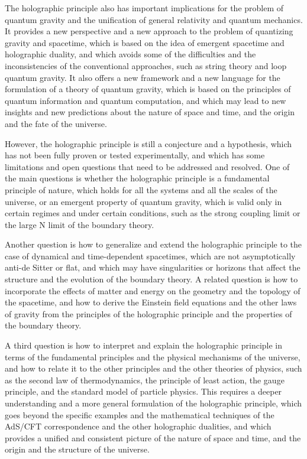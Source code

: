 \begin{tcolorbox}[colback=green!5!white,colframe=green!75!black,title=Question]
The holographic principle also has important implications for the problem of quantum gravity and the unification of general relativity and quantum mechanics. It provides a new perspective and a new approach to the problem of quantizing gravity and spacetime, which is based on the idea of emergent spacetime and holographic duality, and which avoids some of the difficulties and the inconsistencies of the conventional approaches, such as string theory and loop quantum gravity. It also offers a new framework and a new language for the formulation of a theory of quantum gravity, which is based on the principles of quantum information and quantum computation, and which may lead to new insights and new predictions about the nature of space and time, and the origin and the fate of the universe.

However, the holographic principle is still a conjecture and a hypothesis, which has not been fully proven or tested experimentally, and which has some limitations and open questions that need to be addressed and resolved. One of the main questions is whether the holographic principle is a fundamental principle of nature, which holds for all the systems and all the scales of the universe, or an emergent property of quantum gravity, which is valid only in certain regimes and under certain conditions, such as the strong coupling limit or the large N limit of the boundary theory.

Another question is how to generalize and extend the holographic principle to the case of dynamical and time-dependent spacetimes, which are not asymptotically anti-de Sitter or flat, and which may have singularities or horizons that affect the structure and the evolution of the boundary theory. A related question is how to incorporate the effects of matter and energy on the geometry and the topology of the spacetime, and how to derive the Einstein field equations and the other laws of gravity from the principles of the holographic principle and the properties of the boundary theory.

A third question is how to interpret and explain the holographic principle in terms of the fundamental principles and the physical mechanisms of the universe, and how to relate it to the other principles and the other theories of physics, such as the second law of thermodynamics, the principle of least action, the gauge principle, and the standard model of particle physics. This requires a deeper understanding and a more general formulation of the holographic principle, which goes beyond the specific examples and the mathematical techniques of the AdS/CFT correspondence and the other holographic dualities, and which provides a unified and consistent picture of the nature of space and time, and the origin and the structure of the universe.


\end{tcolorbox}
